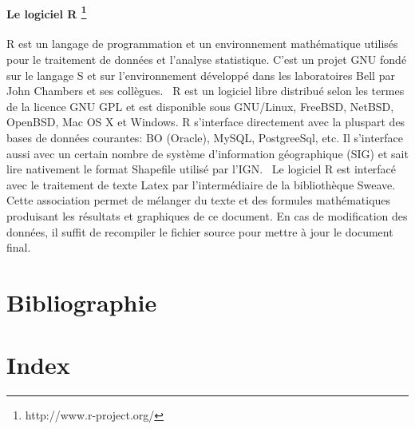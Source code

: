 \documentclass[12pt,english,french,twoside]{report}\usepackage[]{graphicx}\usepackage[]{color}
\begin{document}
\subsubsection*{Le logiciel R \footnote{http://www.r-project.org/}}

R est un langage de programmation et un environnement mathématique utilisés pour le traitement de données et l'analyse statistique. C'est un projet GNU fondé sur le langage S et sur l'environnement développé dans les laboratoires Bell par John Chambers et ses collègues. 
\
R est un logiciel libre distribué selon les termes de la licence GNU GPL et est disponible sous GNU/Linux, FreeBSD, NetBSD, OpenBSD, Mac OS X et Windows. R s'interface directement avec la pluspart des bases de données courantes: BO (Oracle), MySQL, PostgreeSql, etc. Il s'interface aussi avec un certain nombre de système d'information géographique (SIG) et sait lire nativement le format Shapefile utilisé par l'IGN.
\
Le logiciel R est interfacé avec le traitement de texte Latex par l'intermédiaire de la bibliothèque Sweave. Cette association permet de mélanger du texte et des formules mathématiques produisant les résultats et graphiques de ce document. En cas de modification des données, il suffit de recompiler le fichier source pour mettre à jour le document final.


\newpage
\chapter{Bibliographie}


\newpage
\chapter{Index}
\printindex
\end{document}
